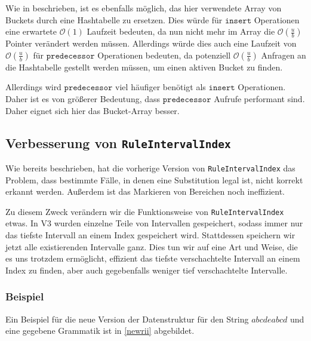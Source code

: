 Wie in \cite{dinklage_engineering_2021} beschrieben, ist es ebenfalls möglich, das hier verwendete Array von Buckets durch eine Hashtabelle zu ersetzen. Dies würde für $\texttt{insert}$ Operationen eine erwartete $\mathcal{O}(1)$ Laufzeit bedeuten, da nun nicht mehr im Array die $\mathcal{O}(\tfrac{u}{b})$ Pointer verändert werden müssen. Allerdings würde dies auch eine Laufzeit von $\mathcal{O}(\tfrac{u}{b})$ für $\texttt{predecessor}$ Operationen bedeuten, da potenziell $\mathcal{O}(\tfrac{u}{b})$ Anfragen an die Hashtabelle gestellt werden müssen, um einen aktiven Bucket zu finden. 

Allerdings wird $\texttt{predecessor}$ viel häufiger benötigt als $\texttt{insert}$ Operationen. Daher ist es von größerer Bedeutung, dass $\texttt{predecessor}$ Aufrufe performant sind. Daher eignet sich hier das Bucket-Array besser.


\subsection{Verbesserung von \texttt{RuleIntervalIndex}}

Wie bereits beschrieben, hat die vorherige Version von \texttt{RuleIntervalIndex} das Problem, dass bestimmte Fälle, in denen eine Substitution legal ist, nicht korrekt erkannt werden. Außerdem ist das Markieren von Bereichen noch ineffizient.  

Zu diesem Zweck verändern wir die Funktionsweise von \texttt{RuleIntervalIndex} etwas. In V3 wurden einzelne Teile von Intervallen gespeichert, sodass immer nur das tiefste Intervall an einem Index gespeichert wird.
Stattdessen speichern wir jetzt alle existierenden Intervalle ganz. Dies tun wir auf eine Art und Weise, die es uns trotzdem ermöglicht, effizient das tiefste verschachtelte Intervall an einem Index zu finden, aber auch gegebenfalls weniger tief verschachtelte Intervalle. 

\subsubsection{Beispiel}

Ein Beispiel für die neue Version der Datenstruktur für den String $abcdeabcd$ und eine gegebene Grammatik ist in \autoref{newrii} abgebildet.

